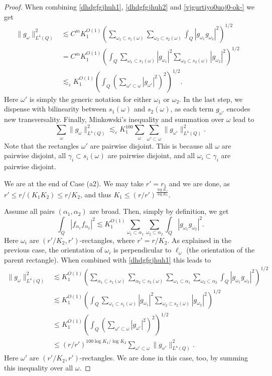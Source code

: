 \documentclass{amsart}%
\numberwithin{equation}{section}
\newcommand{\e}{\varepsilon}
\newcommand{\1}{\mathbbm{1}}
\begin{document}
\begin{proof}
		When combining \eqref{dhdgfgjhuh1},  \eqref{dhdgfgjhuh2} and \eqref{vjgurtiyo0uoj0-ok-} we get
		\begin{align*}
			\|g_\omega\|_{L^{4}(Q)}^2 &\lesssim C^mK_1^{O(1)}(\sum_{\omega_1\subset s_1(\omega)}\sum_{\omega_2\subset s_2(\omega)}\int_{Q}|g_{\omega_1}g_{\omega_2}|^2)^{1/2}&\\&=C^mK_1^{O(1)}(\int_{Q}\sum_{\omega_1\subset s_1(\omega)}|g_{\omega_1}|^2\sum_{\omega_2\subset s_2(\omega)}|g_{\omega_2}|^2)^{1/2}\\&\lesssim_\e K_1^{O(1)}(\int_{Q}(\sum_{\omega'\subset \omega}|g_{\omega'}|^2)^2)^{1/2}.
		\end{align*}
		Here $\omega'$ is simply the generic notation for either $\omega_1$ or $\omega_2$.
        In the last step, we dispense with bilinearity between $s_1(\omega)$ and $s_2(\omega)$, as each term $g_{\omega'}$ encodes new transversality. 
        Finally, Minkowski's inequality and summation over $\omega$ lead to 
		$$\sum_{\omega}\|g_\omega\|_{L^4(Q)}^2\lesssim_\e K_1^{100}\sum_{\omega}\sum_{\omega'\subset \omega}\|g_{\omega'}\|_{L^4(Q)}^2.$$
		Note that the rectangles $\omega'$ are pairwise disjoint. This is because all $\omega$ are pairwise disjoint,  all $\gamma_i\subset s_i(\omega)$ are pairwise disjoint, and all $\omega_i\subset \gamma_i$ are pairwise disjoint.
        \smallskip
		
		We are at the end of Case (a2). We may take $r'=r_1$ and we are done, as $r'\le r/(K_1K_2)\le r/K_2$, and thus $K_1\le (r/r')^{\frac{\log K_1}{\log K_2}}$.
		\bigskip
		
		
	     Assume all pairs $(\alpha_1,\alpha_2)$ are broad. Then, simply by definition, we get
		$$\int_{Q}|f_{\alpha_1}f_{\alpha_2}|^2\lesssim K_1^{O(1)}\sum_{\omega_1\subset\alpha_1}\sum_{\omega_2\subset \alpha_2}\int_{Q}|g_{\omega_1}g_{\omega_2}|^2.$$
		Here $\omega_i$ are $(r'/K_2,r')$-rectangles, where $r'=r/K_2$.
		As explained in the previous case, the orientation of $\omega_i$ is perpendicular to $\ell_\omega$ (the orientation of the parent rectangle). When combined with \eqref{dhdgfgjhuh1} this leads to
		\begin{align*}
			\|g_\omega\|_{L^4(Q)}^2&\lesssim K_1^{O(1)}(\sum_{\alpha_1\subset s_1(\omega)}\sum_{\alpha_2\subset s_2(\omega)}\sum_{\omega_1\subset\alpha_1}\sum_{\omega_2\subset \alpha_2}\int_{Q}|g_{\omega_1}g_{\omega_2}|^2)^{1/2}\\&\lesssim  K_1^{O(1)}(\int_{Q}\sum_{\omega_1\subset s_1(\omega)}|g_{\omega_1}|^2\sum_{\omega_2\subset s_2(\omega)}|g_{\omega_2}|^2)^{1/2}\\&\le K_1^{O(1)}(\int_{Q}(\sum_{\omega'\subset \omega}|g_{\omega'}|^2)^2)^{1/2}\\&\le (r/r')^{100\log K_1/\log K_2} \sum_{\omega'\subset \omega}\|g_{\omega'}\|_{L^4(Q)}^2. 
		\end{align*}
		Here $\omega'$ are $(r'/K_2,r')$-rectangles. We are done in this case, too, by summing this inequality over all $\omega$.  \qedhere
		
		
	\end{proof}
	
\end{document}
